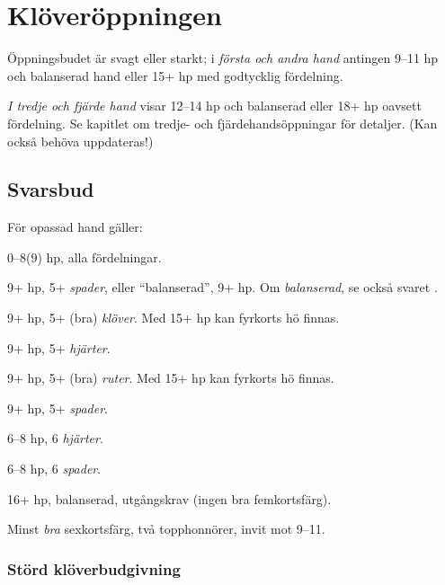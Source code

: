 \chapter{Kl\"over\"oppningen}

\"Oppningsbudet  \"ar svagt eller starkt; i {\em f\"orsta och andra hand}
antingen 9--11 hp och balanserad hand eller 15+ hp med godtycklig f\"ordelning.

{\em I tredje och fj{\"a}rde hand}
 visar  12--14 hp och balanserad eller 18+ hp oavsett fördelning.
Se kapitlet om tredje- och fj\"ardehands\"oppningar f\"or detaljer. (Kan
också behöva uppdateras!)

\section{Svarsbud}

F{\"o}r opassad hand g{\"a}ller:

\bbe
   \item[--\ru{1}] 0--8(9) hp, alla fördelningar.

   \item[--\hj{1}] 9+ hp, 5+ \emph{spader}, eller ``balanserad'', 9+ hp. Om
     \emph{balanserad}, se också svaret .

   \item[--\spa{1}] 9+ hp, 5+ (bra) \emph{klöver}. Med 15+ hp kan fyrkorts hö
     finnas. 
   \item[--\NT{1}] 9+ hp, 5+ \emph{hjärter}.
   \item[--\kl{2}] 9+ hp, 5+ (bra) \emph{ruter}. Med 15+ hp kan fyrkorts hö finnas.
   \item[--\ru{2}] 9+ hp, 5+ \emph{spader}.
   \item[--\hj{2}] 6--8 hp, 6 \emph{hjärter}.
   \item[--\spa{2}] 6--8 hp, 6 \emph{spader}.
   \item[--\NT{2}] 16+ hp, balanserad, utgångskrav (ingen bra femkortsfärg).
   \item[--\la{3}] Minst {\em bra} sexkortsf\"arg, två
     topphonnörer, invit mot 9--11.

\ebe

\subsection{St{\"o}rd kl{\"o}verbudgivning}

